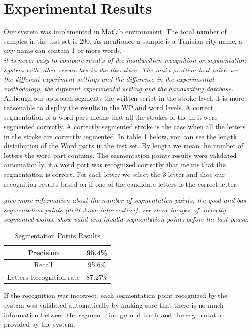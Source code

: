 \documentclass[journal,compsoc]{IEEEtran}
\begin{document}
\section{Experimental Results}
Our system was implemented in Matlab environment. The total number of samples in the test set is 200. As mentioned a sample is a Tunisian city name, a city name can contain 1 or more words. \\
\emph{it is never easy to compare results of the handwritten recognition or segmentation system with other researches in the literature. The main problem that arise are the different experiment settings and the difference in the experimental methodology, the different experimental setting and the handwriting database.}
Although our approach segments the written script in the stroke level, it is more reasonable to display the results in the WP and word levels. A correct segmentation of a word-part means that all the strokes of the in it were segmented correctly. A correctly segmented stroke is the case when all the letters in the stroke are correctly segmented.  In table 1 below, you can see the length distribution of the Word parts in the test set. By length we mean the number of letters the word part contains.
The segmentation points results were validated automatically, if a word part was recognized correctly that means that the segmentation is correct. For each letter we select the 3 letter and shoe our recognition results based on if one of the candidate letters is the correct letter.

\emph{give more information about the number of segmentation points, the good and bas segmentation points (drill down information). see \cite{al2010development}}
\emph{show images of correctly segmented words.}
\emph{show valid and invalid segmentation points before the last phase.}


\begin{table}[h]
\caption{Segmentation Points Results}
\begin{tabular}{ | c | c | }
  \hline                     
   Precision & 95.4\% \\ 
 \hline
  Recall &  95.6\% \\ 
 \hline
  Letters Recognition rate & 87.27\% \\
\hline
\end{tabular}
\centering
\label{table:sp_results} 
\end{table}
If the recognition was incorrect, each segmentation point recognized by the system was validated automatically by making sure that there is no much information between the segmentation ground truth and the segmentation provided by the system.
\end{document}
